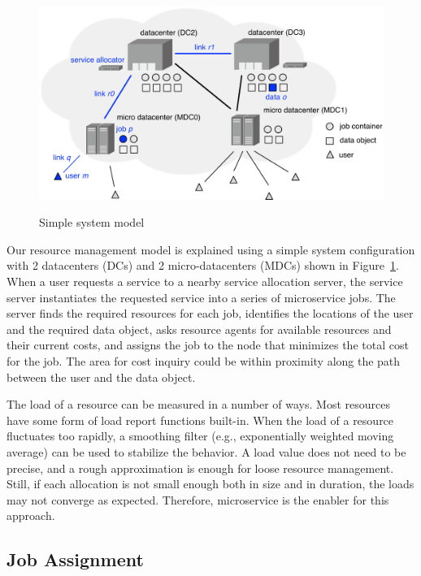 
\begin{figure}[tb]
  \begin{center}
    \includegraphics[width=1.0\columnwidth]{system.pdf}
    \vspace{-2.0ex}
    \caption{Simple system model}
    \label{fig:system}
  \end{center}
\end{figure}

Our resource management model is explained using a simple system
configuration with 2 datacenters (DCs) and 2 micro-datacenters (MDCs)
shown in Figure~\ref{fig:system}.
When a user requests a service to a nearby service allocation server,
the service server instantiates the requested service into a series of
microservice jobs.
The server finds the required resources for each job,
identifies the locations of the user and the required data object,
asks resource agents for available resources and their current costs,
and assigns the job to the node that minimizes the total cost for the
job.
The area for cost inquiry could be within proximity along the path
between the user and the data object.

The load of a resource can be measured in a number of ways.  Most
resources have some form of load report functions built-in.
When the load of a resource fluctuates too rapidly,
a smoothing filter (e.g., exponentially weighted moving average)
can be used to stabilize the behavior.
A load value does not need to be precise, and a rough approximation is
enough for loose resource management.
Still, if each allocation is not small enough both in size and in
duration, the loads may not converge as expected.
Therefore, microservice is the enabler for this approach.

\subsection{Job Assignment}

